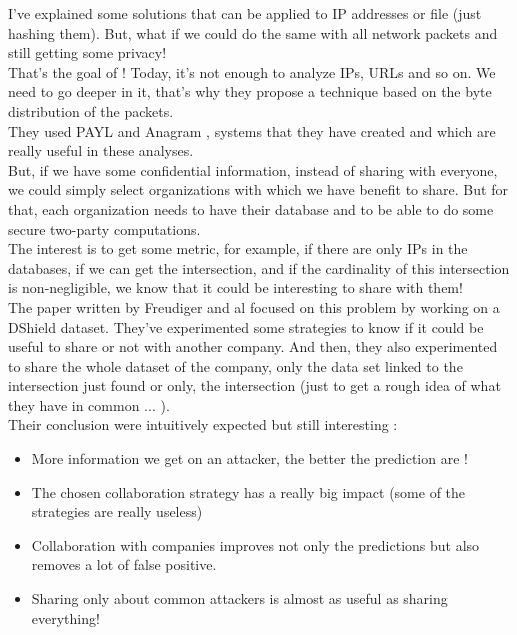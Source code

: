 \documentclass[10pt]{article}
\begin{document}
I've explained some solutions that can be applied to IP addresses or file (just hashing them). But, what if we could do the same with all network packets and still getting some privacy!\\
That's the goal of \cite{parekh2006privacy} ! Today, it's not enough to analyze IPs, URLs and so on. We need to go deeper in it, that's why they propose a technique based on the byte distribution of the packets.\\
They used PAYL and Anagram \cite{wang2006network}, systems that they have created and which are really useful in these analyses.\\

But, if we have some confidential information, instead of sharing with everyone, we could simply select organizations with which we have benefit to share. But for that, each organization needs to have their database and to be able to do some secure two-party computations.\\
The interest is to get some metric, for example, if there are only IPs in the databases, if we can get the intersection, and if the cardinality of this intersection is non-negligible, we know that it could be interesting to share with them!\\
The paper written by Freudiger and al \cite{freudiger2015controlled} focused on this problem by working on a DShield dataset. They've experimented some strategies to know if it could be useful to share or not with another company. And then, they also experimented to share the whole dataset of the company, only the data set linked to the intersection just found or only, the intersection (just to get a rough idea of what they have in common ... ).\\
Their conclusion were intuitively expected but still interesting :
\begin{itemize}
\item More information we get on an attacker, the better the prediction are !
\item The chosen collaboration strategy has a really big impact (some of the strategies are really useless)
\item Collaboration with companies improves not only the predictions but also removes a lot of false positive.
\item Sharing only about common attackers is almost as useful as sharing everything!
\end{itemize}
\end{document}
